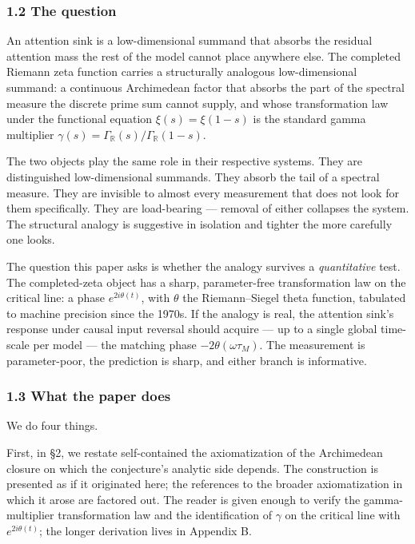 \documentclass[
  letterpaper,
  11pt]{article}
\theoremstyle{plain}
\theoremstyle{definition}
\theoremstyle{remark}
\begin{document}
\subsubsection{1.2 The question}\label{the-question}

An attention sink is a low-dimensional summand that absorbs the residual attention mass the rest of the model cannot place anywhere else. The completed Riemann zeta function carries a structurally analogous low-dimensional summand: a continuous Archimedean factor that absorbs the part of the spectral measure the discrete prime sum cannot supply, and whose transformation law under the functional equation \(\xi(s) = \xi(1-s)\) is the standard gamma multiplier \(\gamma(s) = \Gamma_{\mathbb{R}}(s)/\Gamma_{\mathbb{R}}(1-s)\).

The two objects play the same role in their respective systems. They are distinguished low-dimensional summands. They absorb the tail of a spectral measure. They are invisible to almost every measurement that does not look for them specifically. They are load-bearing --- removal of either collapses the system. The structural analogy is suggestive in isolation and tighter the more carefully one looks.

The question this paper asks is whether the analogy survives a \emph{quantitative} test. The completed-zeta object has a sharp, parameter-free transformation law on the critical line: a phase \(e^{2i\theta(t)}\), with \(\theta\) the Riemann--Siegel theta function, tabulated to machine precision since the 1970s. If the analogy is real, the attention sink's response under causal input reversal should acquire --- up to a single global time-scale per model --- the matching phase \(-2\theta(\omega \tau_M)\). The measurement is parameter-poor, the prediction is sharp, and either branch is informative.

\subsubsection{1.3 What the paper does}\label{what-the-paper-does}

We do four things.

First, in §2, we restate self-contained the axiomatization of the Archimedean closure on which the conjecture's analytic side depends. The construction is presented as if it originated here; the references to the broader axiomatization in which it arose are factored out. The reader is given enough to verify the gamma-multiplier transformation law and the identification of \(\gamma\) on the critical line with \(e^{2i\theta(t)}\); the longer derivation lives in Appendix B.
\end{document}
